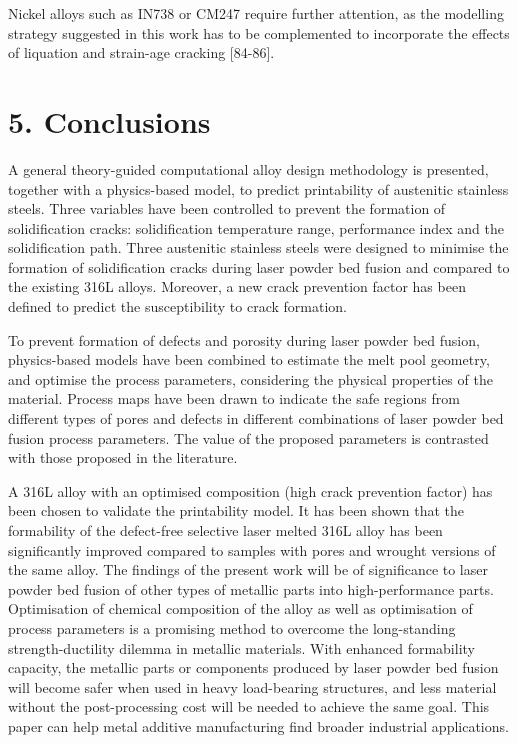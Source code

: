 \documentclass[10pt]{article}
\begin{document}
Nickel alloys such as IN738 or CM247 require further attention, as the modelling strategy suggested in this work has to be complemented to incorporate the effects of liquation and strain-age cracking [84-86].

\section*{5. Conclusions}
A general theory-guided computational alloy design methodology is presented, together with a physics-based model, to predict printability of austenitic stainless steels. Three variables have been controlled to prevent the formation of solidification cracks: solidification temperature range, performance index and the solidification path. Three austenitic stainless steels were designed to minimise the formation of solidification cracks during laser powder bed fusion and compared to the existing 316L alloys. Moreover, a new crack prevention factor has been defined to predict the susceptibility to crack formation.

To prevent formation of defects and porosity during laser powder bed fusion, physics-based models have been combined to estimate the melt pool geometry, and optimise the process parameters, considering the physical properties of the material. Process maps have been drawn to indicate the safe regions from different types of pores and defects in different combinations of laser powder bed fusion process parameters. The value of the proposed parameters is contrasted with those proposed in the literature.

A 316L alloy with an optimised composition (high crack prevention factor) has been chosen to validate the printability model. It has been shown that the formability of the defect-free selective laser melted 316L alloy has been significantly improved compared to samples with pores and wrought versions of the same alloy. The findings of the present work will be of significance to laser powder bed fusion of other types of metallic parts into high-performance parts. Optimisation of chemical composition of the alloy as well as optimisation of process parameters is a promising method to overcome the long-standing strength-ductility dilemma in metallic materials. With enhanced formability capacity, the metallic parts or components produced by laser powder bed fusion will become safer when used in heavy load-bearing structures, and less material without the post-processing cost will be needed to achieve the same goal. This paper can help metal additive manufacturing find broader industrial applications.
\end{document}
